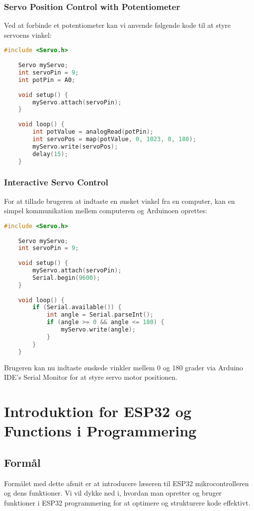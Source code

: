 \subsubsection*{Servo Position Control with Potentiometer}
Ved at forbinde et potentiometer kan vi anvende følgende kode til at styre servoens vinkel:

\begin{lstlisting}[language=C++, caption=Controlling Servo Motor with Potentiometer]
	#include <Servo.h>
	
	Servo myServo;  
	int servoPin = 9;
	int potPin = A0;
	
	void setup() {
		myServo.attach(servoPin);
	}
	
	void loop() {
		int potValue = analogRead(potPin);
		int servoPos = map(potValue, 0, 1023, 0, 180);
		myServo.write(servoPos);
		delay(15);
	}
\end{lstlisting}
\clearpage
\subsubsection*{Interactive Servo Control}
For at tillade brugeren at indtaste en ønsket vinkel fra en computer, kan en simpel kommunikation mellem computeren og Arduinoen oprettes:

\begin{lstlisting}[language=C++, caption=Interactive Servo Motor Control]
	#include <Servo.h>
	
	Servo myServo;
	int servoPin = 9;
	
	void setup() {
		myServo.attach(servoPin);
		Serial.begin(9600);
	}
	
	void loop() {
		if (Serial.available()) {
			int angle = Serial.parseInt();
			if (angle >= 0 && angle <= 180) {
				myServo.write(angle);
			}
		}
	}
\end{lstlisting}
Brugeren kan nu indtaste ønskede vinkler mellem 0 og 180 grader via Arduino IDE's Serial Monitor for at styre servo motor positionen.

\section{Introduktion for ESP32 og Functions i Programmering}

\subsection*{Formål}
Formålet med dette afsnit er at introducere læseren til ESP32 mikrocontrolleren og dens funktioner. Vi vil dykke ned i, hvordan man opretter og bruger funktioner i ESP32 programmering for at optimere og strukturere kode effektivt.

